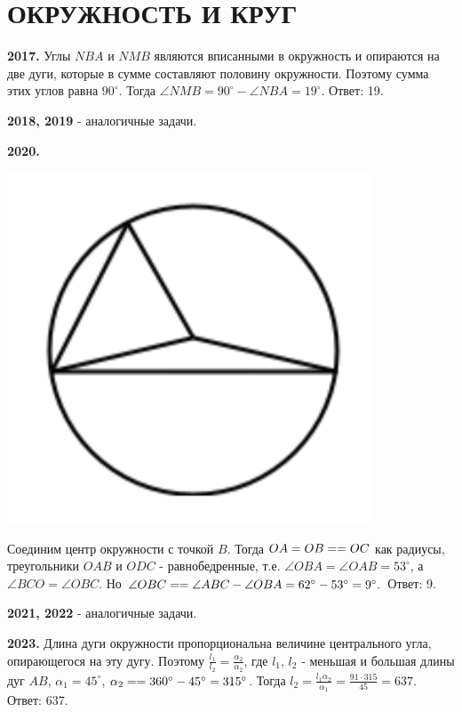 \section{ОКРУЖНОСТЬ И КРУГ}
\pagestyle{plain}

\textbf{2017.} Углы $NBA$ и $NMB$ являются вписанными в окружность и опираются на две дуги, которые в сумме составляют половину окружности. Поэтому сумма этих углов равна $90^\circ$. Тогда $\angle NMB = 90^\circ - \angle NBA = 19^\circ.$ \newline \null \hspace*{\fill} Ответ: 19.

\textbf{2018, 2019} - аналогичные задачи.

\textbf{2020.}

{\centering \includegraphics[width=0.4\linewidth]{Geometry/Content/33.png}
	
}

Соединим центр окружности с точкой $B$. Тогда $OA=OB= \linebreak = OC$ как радиусы, треугольники $OAB$ и $ODC$ - равнобедренные, т.е. $\angle OBA = \angle OAB = 53^\circ$, а $\angle BCO = \angle OBC$. Но $\angle OBC = \linebreak=\angle ABC - \angle OBA = 62^\circ - 53^\circ = 9^\circ.$ \newline \null \hspace*{\fill} Ответ: 9.

\textbf{2021, 2022} - аналогичные задачи.

\textbf{2023.} Длина дуги окружности пропорциональна величине центрального угла, опирающегося на эту дугу. Поэтому $\frac{l_1}{l_2} = \frac{\alpha_2}{\alpha_2}$, где $l_1$, $l_2$ - меньшая и большая длины дуг $AB$, $\alpha_1 = 45^\circ$, $\alpha_2 = \linebreak=360^\circ - 45^\circ = 315^\circ$. Тогда $l_2 = \frac{l_1 \alpha_2}{\alpha_1} = \frac{91\cdot 315}{45} = 637$. \newline \null \hspace*{\fill} Ответ: 637.

